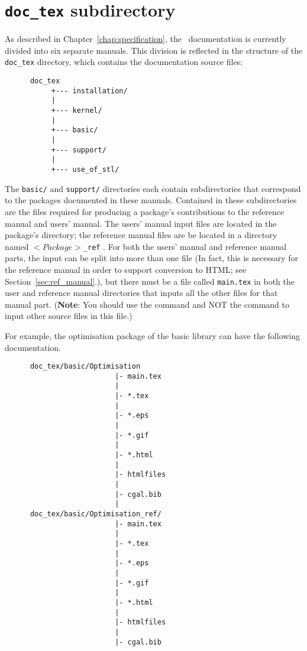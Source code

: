 
\section{{\tt doc\_tex} subdirectory}
\label{sec:doc_tex_subdirectory}

As described in Chapter~\ref{chap:specification}, the \cgal\ documentation is
currently divided into six separate manuals.  This division is reflected
in the structure of the {\tt doc\_tex} directory, which contains the 
documentation source files: 
\begin{verbatim}
      doc_tex
           +--- installation/
           |
           +--- kernel/
           |
           +--- basic/
           |
           +--- support/
           |
           +--- use_of_stl/
\end{verbatim}

The {\tt basic/} and {\tt support/} directories each contain subdirectories
that correspond to the packages documented in these manuals.  Contained in these
subdirectories are the files required for producing a package's contributions
to the reference manual and users' manual. The users' manual input files are
located in the package's directory; the reference manual files are
be located in a directory named $<Package>${\tt \_ref}
.  
For both the users' manual and reference manual parts, the input can be
split into more than one file (In fact, this is necessary for the reference
manual in order to support conversion to HTML; 
see Section~\ref{sec:ref_manual}.), but there must be a file called 
{\tt main.tex} in both the user and reference manual directories that inputs 
all the other files for that manual part.
({\bf Note}: You should use the \verb|| command and NOT the 
\verb|| command to input other source files in this file.)  

For example, the optimisation package of 
the basic library can have the following documentation. 
\begin{verbatim}
      doc_tex/basic/Optimisation
                          |- main.tex
                          |
                          |- *.tex
                          |
                          |- *.eps
                          |
                          |- *.gif
                          |
                          |- *.html
                          |
                          |- htmlfiles
                          |
                          |- cgal.bib
                          |
      doc_tex/basic/Optimisation_ref/
                          |- main.tex
                          |
                          |- *.tex
                          |
                          |- *.eps
                          |
                          |- *.gif
                          |
                          |- *.html
                          |
                          |- htmlfiles
                          |
                          |- cgal.bib
\end{verbatim}

